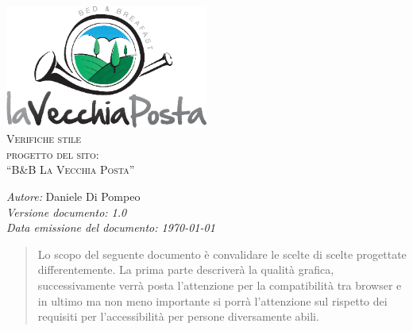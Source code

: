 \documentclass[a4paper,12pt,hidelinks]{report}
\begin{document}
  \begin{titlepage}
    \begin{center}
      \includegraphics[width=0.5\textwidth,keepaspectratio=true]{../img/logo}\\[1cm]    
      \textsc{\LARGE Verifiche stile}\\[0.6cm]
      \textsc{\LARGE  progetto del sito:\\[0.5cm] ``B\&B La Vecchia Posta''}\\ [2.0cm]

      \begin{minipage}{0.8\textwidth}
	\begin{flushleft} \large
	  \emph{Autore:} Daniele Di Pompeo \\[0.5cm]
	  \emph{Versione documento: 1.0}\\[0.5cm]
	  \emph{Data emissione del documento: \today}\\[0.5cm]
	\end{flushleft}
      \end{minipage}
    \end{center}
  \end{titlepage}

 
\begin{abstract}
Lo scopo del seguente documento è convalidare le scelte di scelte progettate differentemente. 
La prima parte descriverà la qualità grafica, successivamente verrà posta
l'attenzione per la compatibilità tra browser e in ultimo ma non meno importante si porrà l'attenzione sul rispetto dei requisiti per l'accessibilità per persone diversamente
abili.
\end{abstract}
\end{document}
